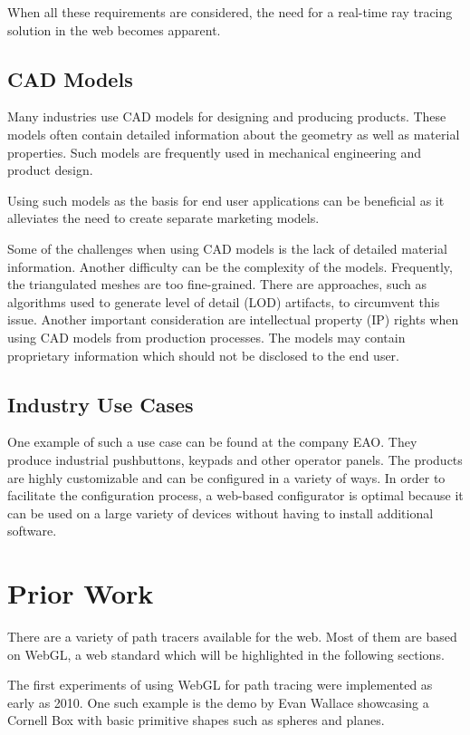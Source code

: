 When all these requirements are considered, the need for a real-time ray tracing solution in the web becomes apparent.

\subsection{CAD Models}

Many industries use CAD models for designing and producing products. These models often contain detailed information about the geometry as well as material properties. Such models are frequently used in mechanical engineering and product design.

Using such models as the basis for end user applications can be beneficial as it alleviates the need to create separate marketing models.

Some of the challenges when using CAD models is the lack of detailed material information. Another difficulty can be the complexity of the models. Frequently, the triangulated meshes are too fine-grained. There are approaches, such as algorithms used to generate level of detail (LOD) artifacts, to circumvent this issue.
Another important consideration are intellectual property (IP) rights when using CAD models from production processes. The models may contain proprietary information which should not be disclosed to the end user.

\subsection{Industry Use Cases}

One example of such a use case can be found at the company EAO. They produce industrial pushbuttons, keypads and other operator panels. The products are highly customizable and can be configured in a variety of ways. In order to facilitate the configuration process, a web-based configurator is optimal because it can be used on a large variety of devices without having to install additional software.

\section{Prior Work}

There are a variety of path tracers available for the web. Most of them are based on WebGL, a web standard which will be highlighted in the following sections.

The first experiments of using WebGL for path tracing were implemented as early as 2010. One such example is the demo by Evan Wallace showcasing a Cornell Box with basic primitive shapes such as spheres and planes.


